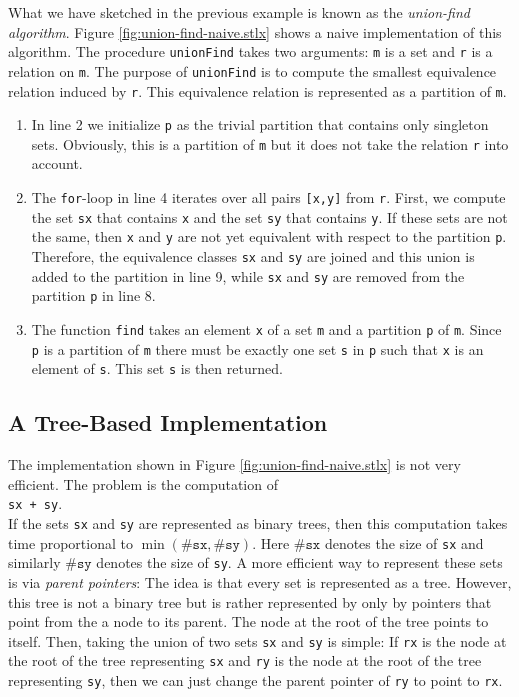 What we have sketched in the previous example is known as the \emph{union-find algorithm}.
Figure \ref{fig:union-find-naive.stlx} shows a naive implementation of this algorithm.  The
procedure \texttt{unionFind} takes two arguments: \texttt{m} is a set and \texttt{r} is a relation
on \texttt{m}.  The purpose of \texttt{unionFind} is to compute the smallest equivalence relation
induced by \texttt{r}.  This equivalence relation is represented as a partition of \texttt{m}.
\begin{enumerate}
\item In line 2 we initialize \texttt{p} as the trivial partition that contains only singleton
      sets.  Obviously, this is a partition of \texttt{m} but it does not take the
      relation \texttt{r} into account.
\item The \texttt{for}-loop in line 4 iterates over all pairs \texttt{[x,y]} from \texttt{r}.
      First, we compute the set \texttt{sx} that contains \texttt{x} and the set \texttt{sy} that
      contains \texttt{y}.  If these sets are not the same, then \texttt{x} and \texttt{y} are not
      yet equivalent with respect to the partition \texttt{p}.  Therefore, the equivalence classes
      \texttt{sx} and \texttt{sy} are joined and this union is added to the partition in line 9, while
      \texttt{sx} and \texttt{sy} are removed from the partition \texttt{p} in line 8.
\item The function \texttt{find} takes an element \texttt{x} of a set \texttt{m} and a partition
      \texttt{p} of \texttt{m}.  Since \texttt{p} is a partition of \texttt{m} there must be exactly
      one set \texttt{s} in \texttt{p} such that \texttt{x} is an element of \texttt{s}.  This set
      \texttt{s} is then returned.
\end{enumerate}

\subsection{A Tree-Based Implementation}
The implementation shown in Figure \ref{fig:union-find-naive.stlx} is not very efficient.  The
problem is the computation of 
\\[0.2cm]
\hspace*{1.3cm}
\texttt{sx + sy}.
\\[0.2cm]
If the sets \texttt{sx} and \texttt{sy} are represented as binary trees, then this computation takes
time proportional to $\min(\mathtt{\#sx},\mathtt{\#sy})$.  Here $\mathtt{\#sx}$ denotes the size of
\texttt{sx} and similarly $\mathtt{\#sy}$ denotes the size of \texttt{sy}.  A more efficient way to
represent these sets is via \emph{parent pointers}:  The idea is that every set is represented as a
tree.  However, this tree is not a binary tree but is rather represented by only by pointers that
point from the a node to its parent.  The node at the root of the tree points to itself.  Then, taking the
union of two sets \texttt{sx} and \texttt{sy} is simple:  If \texttt{rx} is the node at the root of
the tree representing \texttt{sx} and \texttt{ry} is the node at the root of the tree representing
\texttt{sy}, then we can just change the parent pointer of \texttt{ry} to point to \texttt{rx}.

